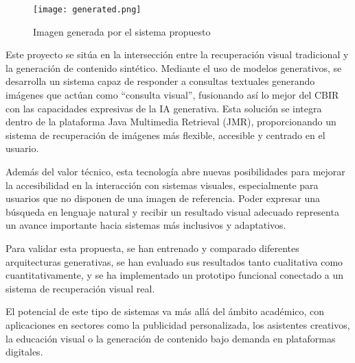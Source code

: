\begin{figure}[ht]
    \centering
    \texttt{[image: generated.png]}
    \caption{Imagen generada por el sistema propuesto}
    \label{fig:generado}
\end{figure}

Este proyecto se sitúa en la intersección entre la recuperación visual tradicional y la generación de contenido sintético. Mediante el uso de modelos generativos, se desarrolla un sistema capaz de responder a consultas textuales generando imágenes que actúan como ``consulta visual'', fusionando así lo mejor del CBIR con las capacidades expresivas de la IA generativa. Esta solución se integra dentro de la plataforma Java Multimedia Retrieval (JMR), proporcionando un sistema de recuperación de imágenes más flexible, accesible y centrado en el usuario.

Además del valor técnico, esta tecnología abre nuevas posibilidades para mejorar la accesibilidad en la interacción con sistemas visuales, especialmente para usuarios que no disponen de una imagen de referencia. Poder expresar una búsqueda en lenguaje natural y recibir un resultado visual adecuado representa un avance importante hacia sistemas más inclusivos y adaptativos.

Para validar esta propuesta, se han entrenado y comparado diferentes arquitecturas generativas, se han evaluado sus resultados tanto cualitativa como cuantitativamente, y se ha implementado un prototipo funcional conectado a un sistema de recuperación visual real.

El potencial de este tipo de sistemas va más allá del ámbito académico, con aplicaciones en sectores como la publicidad personalizada, los asistentes creativos, la educación visual o la generación de contenido bajo demanda en plataformas digitales.
